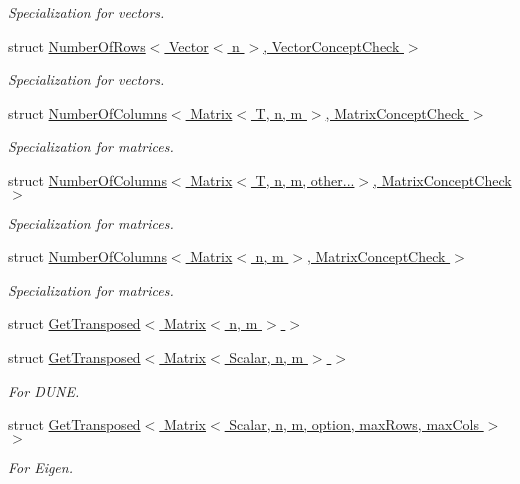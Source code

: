 \begin{DoxyCompactItemize}
\begin{DoxyCompactList}\small\item\em \-Specialization for vectors. \end{DoxyCompactList}\item 
struct \hyperlink{structFunG_1_1LinearAlgebra_1_1NumberOfRows_3_01Vector_3_01n_01_4_00_01VectorConceptCheck_01_4}{\-Number\-Of\-Rows$<$ Vector$<$ n $>$, Vector\-Concept\-Check $>$}
\begin{DoxyCompactList}\small\item\em \-Specialization for vectors. \end{DoxyCompactList}\item 
struct \hyperlink{structFunG_1_1LinearAlgebra_1_1NumberOfColumns_3_01Matrix_3_01T_00_01n_00_01m_01_4_00_01MatrixConceptCheck_01_4}{\-Number\-Of\-Columns$<$ Matrix$<$ T, n, m $>$, Matrix\-Concept\-Check $>$}
\begin{DoxyCompactList}\small\item\em \-Specialization for matrices. \end{DoxyCompactList}\item 
struct \hyperlink{structFunG_1_1LinearAlgebra_1_1NumberOfColumns_3_01Matrix_3_01T_00_01n_00_01m_00_01other_8_8_8_4_00_01MatrixConceptCheck_01_4}{\-Number\-Of\-Columns$<$ Matrix$<$ T, n, m, other...$>$, Matrix\-Concept\-Check $>$}
\begin{DoxyCompactList}\small\item\em \-Specialization for matrices. \end{DoxyCompactList}\item 
struct \hyperlink{structFunG_1_1LinearAlgebra_1_1NumberOfColumns_3_01Matrix_3_01n_00_01m_01_4_00_01MatrixConceptCheck_01_4}{\-Number\-Of\-Columns$<$ Matrix$<$ n, m $>$, Matrix\-Concept\-Check $>$}
\begin{DoxyCompactList}\small\item\em \-Specialization for matrices. \end{DoxyCompactList}\item 
struct \hyperlink{structFunG_1_1LinearAlgebra_1_1GetTransposed_3_01Matrix_3_01n_00_01m_01_4_01_4}{\-Get\-Transposed$<$ Matrix$<$ n, m $>$ $>$}
\item 
struct \hyperlink{structFunG_1_1LinearAlgebra_1_1GetTransposed_3_01Matrix_3_01Scalar_00_01n_00_01m_01_4_01_4}{\-Get\-Transposed$<$ Matrix$<$ Scalar, n, m $>$ $>$}
\begin{DoxyCompactList}\small\item\em \-For \-D\-U\-N\-E. \end{DoxyCompactList}\item 
struct \hyperlink{structFunG_1_1LinearAlgebra_1_1GetTransposed_3_01Matrix_3_01Scalar_00_01n_00_01m_00_01option_00_837706e7e2f5ff6060578b88ee4bef60}{\-Get\-Transposed$<$ Matrix$<$ Scalar, n, m, option, max\-Rows, max\-Cols $>$ $>$}
\begin{DoxyCompactList}\small\item\em \-For \-Eigen. \end{DoxyCompactList}\end{DoxyCompactItemize}
